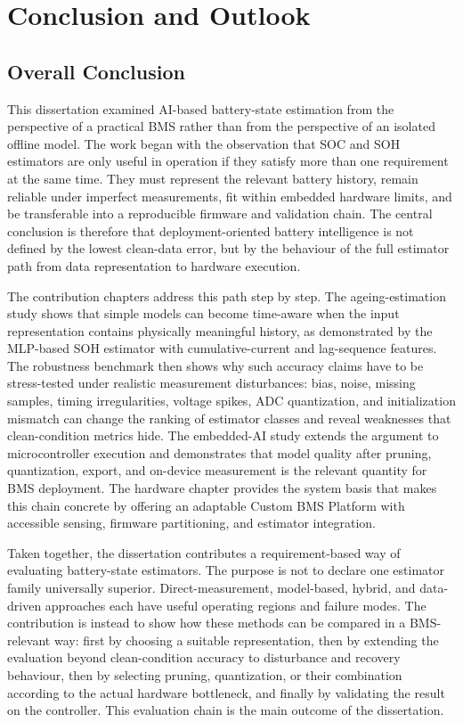 \documentclass[
    a4paper,
    12pt,
    titlepage,
    bibliography=totoc,
    twoside=on,
    parskip=false,
    numbers=noenddot,
    cleardoublepage=empty,
    DIV=12,
    BCOR=12.0mm,
    headheight=36pt,
    headings=openright
]{scrreprt}
\begin{document}
\chapter{Conclusion and Outlook}
\section{Overall Conclusion}
This dissertation examined AI-based battery-state estimation from the perspective of a practical BMS rather than from the perspective of an isolated offline model. The work began with the observation that SOC and SOH estimators are only useful in operation if they satisfy more than one requirement at the same time. They must represent the relevant battery history, remain reliable under imperfect measurements, fit within embedded hardware limits, and be transferable into a reproducible firmware and validation chain. The central conclusion is therefore that deployment-oriented battery intelligence is not defined by the lowest clean-data error, but by the behaviour of the full estimator path from data representation to hardware execution.

The contribution chapters address this path step by step. The ageing-estimation study shows that simple models can become time-aware when the input representation contains physically meaningful history, as demonstrated by the MLP-based SOH estimator with cumulative-current and lag-sequence features. The robustness benchmark then shows why such accuracy claims have to be stress-tested under realistic measurement disturbances: bias, noise, missing samples, timing irregularities, voltage spikes, ADC quantization, and initialization mismatch can change the ranking of estimator classes and reveal weaknesses that clean-condition metrics hide. The embedded-AI study extends the argument to microcontroller execution and demonstrates that model quality after pruning, quantization, export, and on-device measurement is the relevant quantity for BMS deployment. The hardware chapter provides the system basis that makes this chain concrete by offering an adaptable Custom BMS Platform with accessible sensing, firmware partitioning, and estimator integration.

Taken together, the dissertation contributes a requirement-based way of evaluating battery-state estimators. The purpose is not to declare one estimator family universally superior. Direct-measurement, model-based, hybrid, and data-driven approaches each have useful operating regions and failure modes. The contribution is instead to show how these methods can be compared in a BMS-relevant way: first by choosing a suitable representation, then by extending the evaluation beyond clean-condition accuracy to disturbance and recovery behaviour, then by selecting pruning, quantization, or their combination according to the actual hardware bottleneck, and finally by validating the result on the controller. This evaluation chain is the main outcome of the dissertation.
\end{document}
